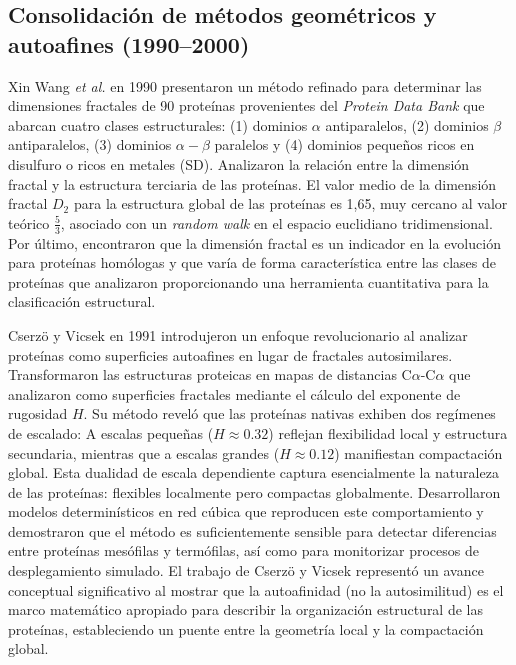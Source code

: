 \subsection{Consolidación de métodos geométricos y autoafines (1990--2000)}


Xin Wang \textit{et al.} \cite{Wang1990} en 1990 presentaron un método refinado para determinar las dimensiones fractales de 90 proteínas provenientes del \textit{Protein Data Bank} que abarcan cuatro clases estructurales: (1) dominios $\alpha$ antiparalelos, (2) dominios $\beta$ antiparalelos, (3) dominios $\alpha-\beta$ paralelos y (4) dominios pequeños ricos en disulfuro o ricos en metales (SD). Analizaron la relación entre la dimensión fractal y la estructura terciaria de las proteínas. El valor medio de la dimensión fractal $D_{2}$ para la estructura global de las proteínas es 1,65, muy cercano al valor teórico $\frac{5}{3}$, asociado con un \textit{random walk} en el espacio euclidiano tridimensional. Por último, encontraron que la dimensión fractal es un indicador en la evolución para proteínas homólogas y que varía de forma característica entre las clases de proteínas que analizaron proporcionando una herramienta cuantitativa para la clasificación estructural.


Cserzö y Vicsek en 1991 \cite{Cserzo1991} introdujeron un enfoque revolucionario al analizar proteínas como superficies autoafines en lugar de fractales autosimilares. Transformaron las estructuras proteicas en mapas de distancias C$\alpha$-C$\alpha$ que analizaron como superficies fractales mediante el cálculo del exponente de rugosidad $H$. Su método reveló que las proteínas nativas exhiben dos regímenes de escalado: A escalas pequeñas ($H \approx 0.32$) reflejan flexibilidad local y estructura secundaria, mientras que a escalas grandes ($H \approx 0.12$) manifiestan compactación global. Esta dualidad de escala dependiente captura esencialmente la naturaleza de las proteínas: flexibles localmente pero compactas globalmente. Desarrollaron modelos determinísticos en red cúbica que reproducen este comportamiento y demostraron que el método es suficientemente sensible para detectar diferencias entre proteínas mesófilas y termófilas, así como para monitorizar procesos de desplegamiento simulado. El trabajo de Cserzö y Vicsek representó un avance conceptual significativo al mostrar que la autoafinidad (no la autosimilitud) es el marco matemático apropiado para describir la organización estructural de las proteínas, estableciendo un puente entre la geometría local y la compactación global.


